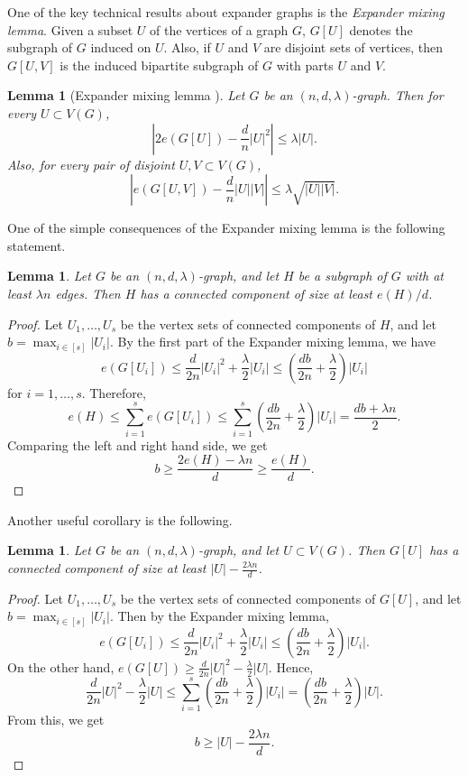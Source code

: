\documentclass[11pt]{article}
\theoremstyle{plain}
\newtheorem{lemma}[theorem]{Lemma}
\theoremstyle{definition}
\begin{document}
One of the key technical results about expander graphs is the \emph{Expander mixing lemma}. Given a subset $U$ of the vertices of a graph $G$, $G[U]$ denotes the subgraph of $G$ induced on $U$. Also, if $U$ and $V$ are disjoint sets of vertices, then $G[U,V]$ is the induced bipartite subgraph of $G$ with parts $U$ and $V$. 

\begin{lemma}[Expander mixing lemma \cite{AC}]
Let $G$ be an $(n,d,\lambda)$-graph. Then for every $U\subset V(G)$,
$$\left|2e(G[U])-\frac{d}{n}|U|^2\right|\leq \lambda |U|.$$
Also, for every pair of disjoint $U,V\subset V(G)$,
$$\left|e(G[U,V])-\frac{d}{n}|U||V|\right|\leq \lambda \sqrt{|U||V|}.$$
\end{lemma}

\noindent
One of the simple consequences of the Expander mixing lemma is the following statement.

\begin{lemma}\label{lemma:component}
Let $G$ be an $(n,d,\lambda)$-graph, and let $H$ be a subgraph of $G$ with at least $\lambda n$ edges. Then $H$ has a connected component of size at least $e(H)/d$.
\end{lemma}

\begin{proof}
Let $U_1,\dots,U_s$ be the vertex sets of connected components of $H$, and let $b=\max_{i\in [s]} |U_i|$. By the first part of the Expander mixing lemma, we have 
$$e(G[U_i])\leq \frac{d}{2n}|U_i|^2+\frac{\lambda}{2}|U_i|\leq \left(\frac{db}{2n}+\frac{\lambda}{2}\right)|U_i|$$ for $i=1,\dots,s$. Therefore,
$$e(H)\leq \sum_{i=1}^s e(G[U_i])\leq \sum_{i=1}^s\left(\frac{db}{2n}+\frac{\lambda}{2}\right)|U_i|= \frac{db+\lambda n}{2}.$$
Comparing the left and right hand side, we get $$b\geq \frac{2e(H)-\lambda n}{d}\geq \frac{e(H)}{d}.$$
\end{proof}

\noindent
Another useful corollary is the following.

\begin{lemma}\label{lemma:large_component}
    Let $G$ be an $(n,d,\lambda)$-graph, and let $U\subset V(G)$. Then $G[U]$ has a connected component of size at least $|U|-\frac{2\lambda n}{d}$.
\end{lemma}

\begin{proof}
Let $U_1,\dots,U_{s}$ be the vertex sets of connected components of $G[U]$, and let $b=\max_{i\in [s]} |U_i|$. Then by the Expander mixing lemma, $$e(G[U_i])\leq \frac{d}{2n}|U_i|^2+\frac{\lambda}{2}|U_i|\leq \left(\frac{db}{2n}+\frac{\lambda}{2}\right)|U_i|.$$
On the other hand, $e(G[U])\geq \frac{d}{2n}|U|^2-\frac{\lambda}{2} |U|$. Hence,
$$\frac{d}{2n}|U|^2-\frac{\lambda}{2} |U|\leq \sum_{i=1}^{s}\left(\frac{db}{2n}+\frac{\lambda}{2}\right)|U_i|=\left(\frac{db}{2n}+\frac{\lambda}{2}\right)|U|.$$
From this, we get
$$b\geq |U|-\frac{2\lambda n}{d}.$$
\end{proof}
\end{document}
